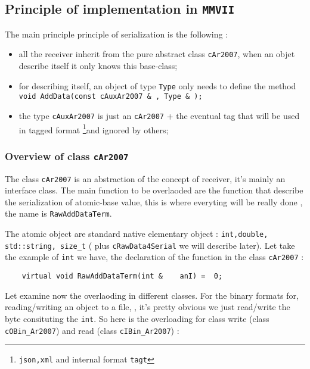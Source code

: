 
\subsection{Principle of implementation in {\tt MMVII}}

The main principle principle of serialization is the following :

\begin{itemize}
       \item  all the receiver inherit from the pure abstract class {\tt cAr2007},
               when an objet describe itself it only knows this base-class;

       \item for describing itself, an object of type {\tt Type} only needs to define
	       the method {\tt void AddData(const  cAuxAr2007 \& , Type  \& );}

       \item the type {\tt cAuxAr2007} is just an {\tt cAr2007} + the eventual tag that will
             be used in tagged format \footnote{{\tt json,xml} and internal format {\tt tagt}}and ignored
             by others;
\end{itemize}


\subsubsection{Overview of class {\tt cAr2007}}

The class {\tt cAr2007} is an abstraction of the concept of receiver, it's mainly an interface class.
The main function to be overlaoded are the function that describe the serialization of atomic-base  value,
this is where everyting will be really done , the name is {\tt RawAddDataTerm}.

The atomic object are standard native elementary object : {\tt int,double, std::string, size\_t} ( plus
{\tt cRawData4Serial} we will describe later). Let take the example of {\tt int} we have, the declaration
of the function in the class  {\tt cAr2007} :

\begin{verbatim}
    virtual void RawAddDataTerm(int &    anI) =  0;
\end{verbatim}

Let examine now the overlaoding in different classes. For the binary formats for, reading/writing an object to a file,
, it's pretty obvious we just read/write the byte consituting the {\tt int}. So here is the overloading
for class write (class {\tt cOBin\_Ar2007}) and read (class {\tt cIBin\_Ar2007}) :

